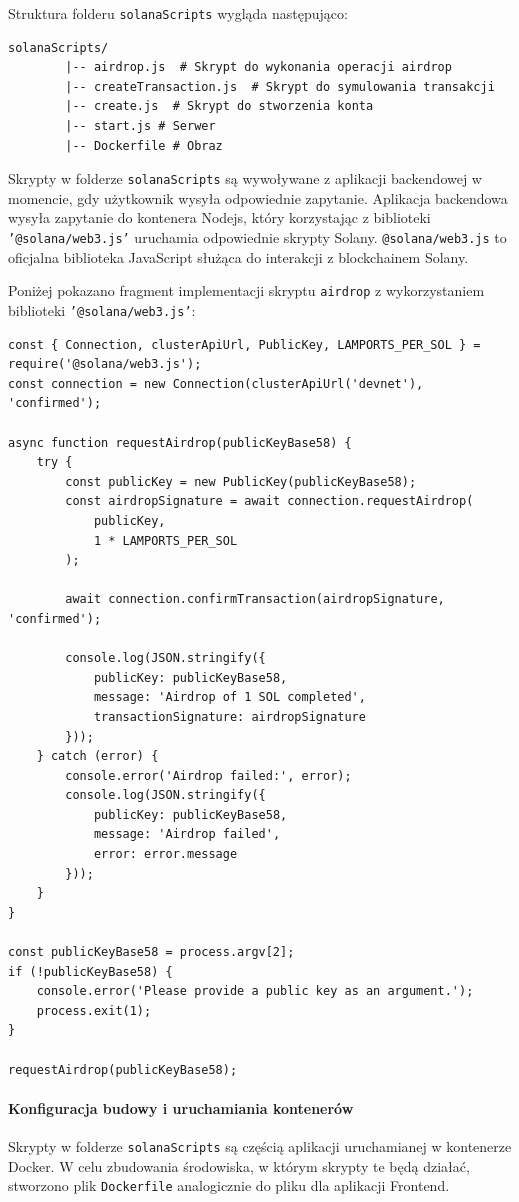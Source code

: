 Struktura folderu \texttt{solanaScripts} wygląda następująco:
\begin{lstlisting}[basicstyle=\footnotesize\ttfamily,tabsize=4]
solanaScripts/
		|-- airdrop.js  # Skrypt do wykonania operacji airdrop
		|-- createTransaction.js  # Skrypt do symulowania transakcji
		|-- create.js  # Skrypt do stworzenia konta
		|-- start.js # Serwer
		|-- Dockerfile # Obraz 
\end{lstlisting}

Skrypty w folderze \texttt{solanaScripts} są wywoływane z aplikacji backendowej w momencie, gdy użytkownik wysyła odpowiednie zapytanie. Aplikacja backendowa wysyła zapytanie do kontenera Nodejs, który korzystając z biblioteki \texttt{'@solana/web3.js'} uruchamia odpowiednie skrypty Solany. \texttt{@solana/web3.js} to oficjalna biblioteka JavaScript służąca do interakcji z blockchainem Solany.  

Poniżej pokazano fragment implementacji skryptu \texttt{airdrop} z wykorzystaniem biblioteki \texttt{'@solana/web3.js'}:
\begin{lstlisting}[style=JavaScriptStyle]
const { Connection, clusterApiUrl, PublicKey, LAMPORTS_PER_SOL } = require('@solana/web3.js');
const connection = new Connection(clusterApiUrl('devnet'), 'confirmed');

async function requestAirdrop(publicKeyBase58) {
    try {
        const publicKey = new PublicKey(publicKeyBase58);
        const airdropSignature = await connection.requestAirdrop(
            publicKey,
            1 * LAMPORTS_PER_SOL
        );

        await connection.confirmTransaction(airdropSignature, 'confirmed');

        console.log(JSON.stringify({
            publicKey: publicKeyBase58,
            message: 'Airdrop of 1 SOL completed',
            transactionSignature: airdropSignature
        }));
    } catch (error) {
        console.error('Airdrop failed:', error);
        console.log(JSON.stringify({
            publicKey: publicKeyBase58,
            message: 'Airdrop failed',
            error: error.message
        }));
    }
}

const publicKeyBase58 = process.argv[2];
if (!publicKeyBase58) {
    console.error('Please provide a public key as an argument.');
    process.exit(1);
}

requestAirdrop(publicKeyBase58);
\end{lstlisting}


\paragraph{Konfiguracja budowy i uruchamiania kontenerów}
Skrypty w folderze \texttt{solanaScripts} są częścią aplikacji uruchamianej w kontenerze Docker. W celu zbudowania środowiska, w którym skrypty te będą działać, stworzono plik \texttt{Dockerfile} analogicznie do pliku dla aplikacji Frontend. 

